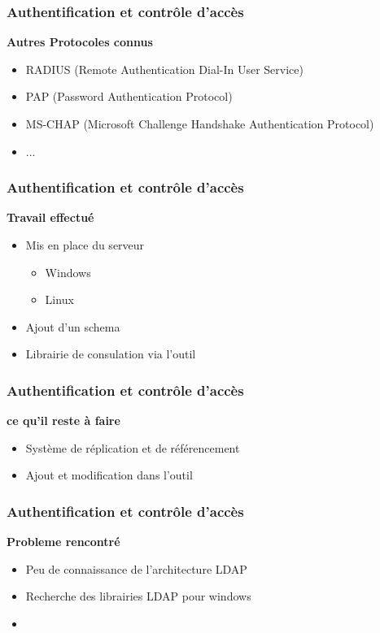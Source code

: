 \begin{frame}
  \frametitle{Authentification et contrôle d'accès}
  \begin{block}{\textbf{Autres Protocoles connus}}
  \begin{itemize}
  \item RADIUS (Remote Authentication Dial-In User Service)
  \item PAP (Password Authentication Protocol)
  \item MS-CHAP (Microsoft Challenge Handshake Authentication Protocol)
  \item ... 
  \end{itemize}
  \end{block}
\end{frame}

\begin{frame}
  \frametitle{Authentification et contrôle d'accès}
  \begin{block}{\textbf{Travail effectué}}
  \begin{itemize}
  \item Mis en place du serveur 
    \begin{itemize}
    \item Windows
    \item Linux
    \end{itemize}
  \item Ajout d'un schema 
  \item Librairie de consulation via l'outil %
  \end{itemize}
  \end{block}
\end{frame}

\begin{frame}
  \frametitle{Authentification et contrôle d'accès}
  \begin{block}{\textbf{ce qu'il reste à faire}}
  \begin{itemize}
  \item Système de réplication et de référencement 
  \item Ajout et modification dans l'outil
  \end{itemize}
  \end{block}
\end{frame}

\begin{frame}
  \frametitle{Authentification et contrôle d'accès}
  \begin{block}{\textbf{Probleme rencontré }}
  \begin{itemize}
  \item Peu de connaissance de l'architecture LDAP
  \item Recherche des librairies LDAP pour windows 
  \item 
  \end{itemize}
  \end{block}
\end{frame}
